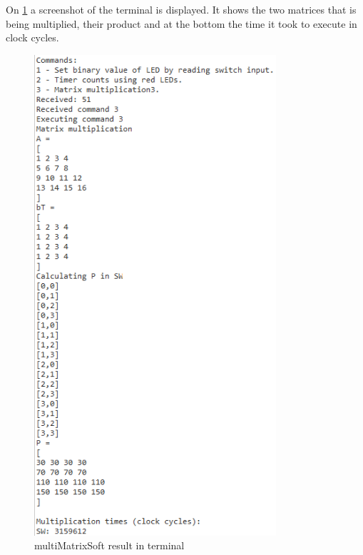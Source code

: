 On \cref{fig:multiMatrixSoft} a screenshot of the terminal is displayed. It shows the two matrices that is being multiplied, their product and at the bottom the time it took to execute in clock cycles.  

\begin{figure}[H]
	\centering
	\includegraphics[width=0.8\textwidth]{Images/multiMatrixSoft.png}
	\caption{multiMatrixSoft result in terminal}
	\label{fig:multiMatrixSoft}
\end{figure}

 
 